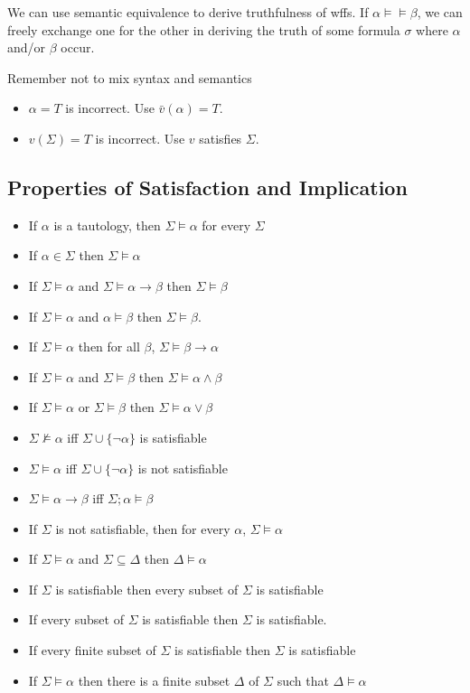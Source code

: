 We can use semantic equivalence to derive truthfulness of wffs. If $\alpha\vDash\models\beta$, we can freely exchange one for the other in deriving the truth of some formula $\sigma$ where $\alpha$ and/or $\beta$ occur.

Remember not to mix syntax and semantics

\begin{itemize}
    \item $\alpha=T$ is incorrect. Use $\bar{v}(\alpha)=T$.
    \item $v(\Sigma)=T$ is incorrect. Use $v$ satisfies $\Sigma$.
\end{itemize}

\subsection{Properties of Satisfaction and Implication}

\begin{itemize}
    \item If $\alpha$ is a tautology, then $\Sigma\vDash\alpha$ for every $\Sigma$
    \item If $\alpha\in\Sigma$ then $\Sigma\vDash\alpha$
    \item If $\Sigma\vDash\alpha$ and $\Sigma\vDash\alpha\to\beta$ then $\Sigma\vDash\beta$
    \item If $\Sigma\vDash\alpha$ and $\alpha\vDash\beta$ then $\Sigma\vDash\beta$.
    \item If $\Sigma\vDash\alpha$ then for all $\beta$, $\Sigma\vDash\beta\to\alpha$
    \item If $\Sigma\vDash\alpha$ and $\Sigma\vDash\beta$ then $\Sigma\vDash \alpha\wedge\beta$
    \item If $\Sigma\vDash\alpha$ or $\Sigma\vDash\beta$ then $\Sigma\vDash \alpha\vee\beta$
    \item $\Sigma\nvDash\alpha$ iff $\Sigma\cup\{\neg\alpha\}$ is satisfiable
    \item $\Sigma \vDash \alpha$ iff $\Sigma \cup \{\neg \alpha\}$ is not satisfiable
    \item $\Sigma \vDash \alpha \to \beta$ iff $\Sigma;\alpha \vDash \beta$
    \item If $\Sigma$ is not satisfiable, then for every $\alpha$, $\Sigma\vDash\alpha$
    \item If $\Sigma\vDash\alpha$ and $\Sigma\subseteq\Delta$ then $\Delta\vDash\alpha$
    \item If $\Sigma$ is satisfiable then every subset of $\Sigma$ is satisfiable
    \item If every subset of $\Sigma$ is satisfiable then $\Sigma$ is satisfiable.
    \item If every finite subset of $\Sigma$ is satisfiable then $\Sigma$ is satisfiable
    \item If $\Sigma\vDash\alpha$ then there is a finite subset $\Delta$ of $\Sigma$ such that $\Delta\vDash\alpha$
\end{itemize}

